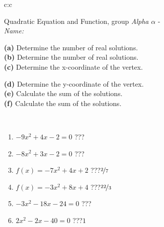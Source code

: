 \documentclass[10pt]{report}
\begin{document}
\thispagestyle{empty}
\begin{tabular}{c:c}
\begin{minipage}[c][104.5mm][t]{0.5\linewidth}
\begin{center}
\vspace{7mm}
{\huge {\LARGE Quadratic Equation and Function}, group \textit{Alpha $\alpha$} -}\\[5mm]
\textit{Name:}\phantom{xxxxxxxxxxxxxxxxxxxxxxxxxxxxxxxxxxxxxxxxxxxxxxxxxxxxxxxxxxxxxxxxx}\\[5mm]
\begin{minipage}{0.95\linewidth}
\begin{center}
{\small \begin{minipage}{0.5\textwidth}
\textbf{(a)} Determine the number of real solutions. \\[1mm]
\textbf{(b)} Determine the number of real solutions. \\[1mm]
\textbf{(c)} Determine the x-coordinate of the vertex.
\end{minipage} \begin{minipage}{0.49\textwidth}
\textbf{(d)} Determine the y-coordinate of the vertex. \\[1mm]
\textbf{(e)} Calculate the sum of the solutions. \\[1mm]
\textbf{(f)} Calculate the sum of the solutions.
\end{minipage}
}
\end{center}
\end{minipage}
\\[4mm]
\begin{minipage}{0.79\linewidth}
\begin{center}
\begin{varwidth}{\linewidth}
\begin{enumerate}
\Large
\item $-9x^2+4x-2=0$\quad \dotfill\; ???\;\dotfill {}
\item $-8x^2+3x-2=0$\quad \dotfill\; ???\;\dotfill {}
\item $f(x)=-7x^2+4x+2$\quad \dotfill\; ???\;\dotfill \quad $\nicefrac{2}{7}$
\item $f(x)=-3x^2+8x+4$\quad \dotfill\; ???\;\dotfill \quad $\nicefrac{22}{3}$
\item $-3x^2-18x-24=0$\quad \dotfill\; ???\;\dotfill {}
\item $2x^2-2x-40=0$\quad \dotfill\; ???\;\dotfill \quad $1$
\end{enumerate}
\end{varwidth}

\end{center}
\end{minipage}
\end{center}
\end{minipage}
\end{tabular}
\end{document}
